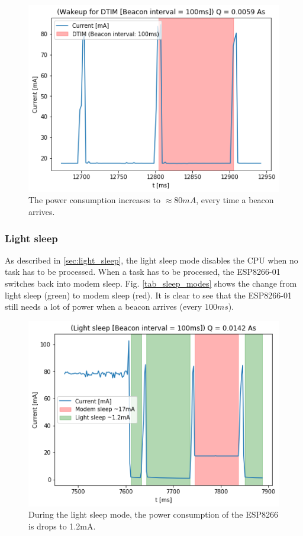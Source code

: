 \begin{figure}[H]
    \includegraphics[width = \linewidth]{fig/beacon_interval.png}
    \caption{The power consumption increases to $\approx 80mA$, every time a beacon arrives.}
    \label{fig:beacon_interval}
\end{figure}

\subsubsection{Light sleep}
As described in \ref{sec:light_sleep}, the light sleep mode disables the CPU when no task has to be processed.
When a task has to be processed, the ESP8266-01 switches back into modem sleep.
Fig. \ref{tab_sleep_modes} shows the change from light sleep (green) to modem sleep (red).
It is clear to see that the ESP8266-01 still needs a lot of power when a beacon arrives (every $100ms$).

\begin{figure}[H]
    \includegraphics[width = \linewidth]{fig/light_sleep.png}
    \caption{During the light sleep mode, the power consumption of the ESP8266 is drops to 1.2mA.}
    \label{fig:light_sleep}
\end{figure}


